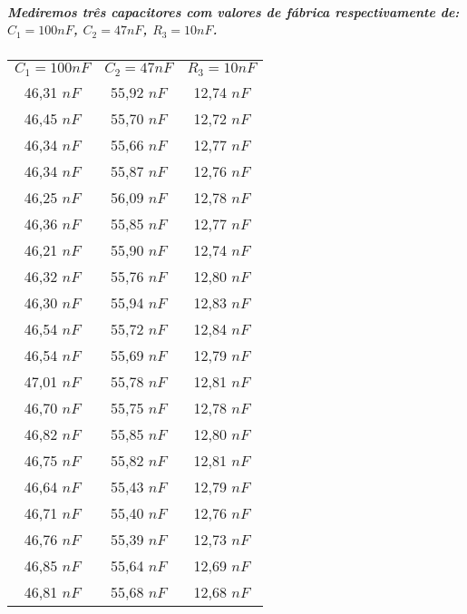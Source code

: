 \documentclass[12pt,twoside, a4paper, twocolumn]{article}
\begin{document}
\subparagraph*{Mediremos três capacitores com valores de fábrica respectivamente de: $C_1 = 100 nF$, $C_2 = 47 nF$, $R_3 = 10 nF$.}
\begin{center}
    \begin{tabular}{ |c|c|c| }
        \hline
        $C_1 = 100 nF$ & $C_2 = 47 nF$ & $R_3 = 10 nF$ \\
        46,31 $nF$     & 55,92 $nF$    & 12,74 $nF$    \\
        46,45 $nF$     & 55,70 $nF$    & 12,72 $nF$    \\
        46,34 $nF$     & 55,66 $nF$    & 12,77 $nF$    \\
        46,34 $nF$     & 55,87 $nF$    & 12,76 $nF$    \\
        46,25 $nF$     & 56,09 $nF$    & 12,78 $nF$    \\
        46,36 $nF$     & 55,85 $nF$    & 12,77 $nF$    \\
        46,21 $nF$     & 55,90 $nF$    & 12,74 $nF$    \\
        46,32 $nF$     & 55,76 $nF$    & 12,80 $nF$    \\
        46,30 $nF$     & 55,94 $nF$    & 12,83 $nF$    \\
        46,54 $nF$     & 55,72 $nF$    & 12,84 $nF$    \\
        46,54 $nF$     & 55,69 $nF$    & 12,79 $nF$    \\
        47,01 $nF$     & 55,78 $nF$    & 12,81 $nF$    \\
        46,70 $nF$     & 55,75 $nF$    & 12,78 $nF$    \\
        46,82 $nF$     & 55,85 $nF$    & 12,80 $nF$    \\
        46,75 $nF$     & 55,82 $nF$    & 12,81 $nF$    \\
        46,64 $nF$     & 55,43 $nF$    & 12,79 $nF$    \\
        46,71 $nF$     & 55,40 $nF$    & 12,76 $nF$    \\
        46,76 $nF$     & 55,39 $nF$    & 12,73 $nF$    \\
        46,85 $nF$     & 55,64 $nF$    & 12,69 $nF$    \\
        46,81 $nF$     & 55,68 $nF$    & 12,68 $nF$    \\

        \hline
    \end{tabular}
\end{center}
\end{document}
